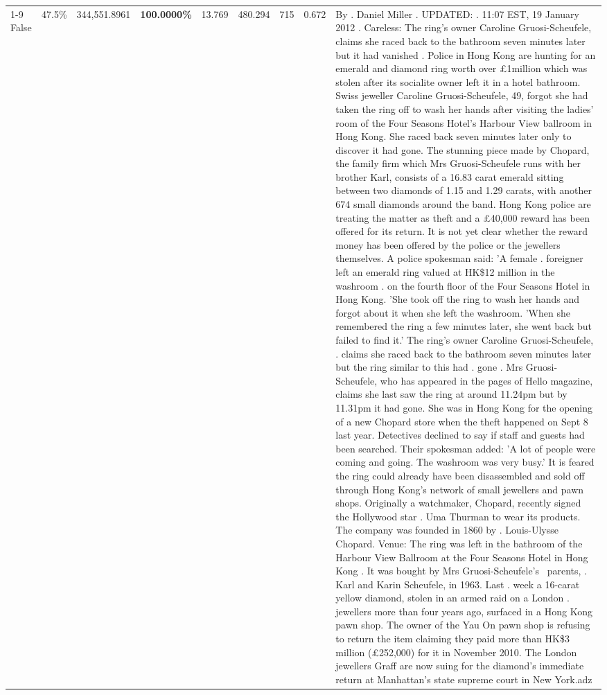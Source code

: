 \begin{table}[H]
\begin{tabular}{lllrlllll}
\cline{1-9}
False & 47.5\% & 344,551.8961 & \bfseries \color{red} 100.0000\% & 13.769 & 480.294 & 715 & 0.672 & By . Daniel Miller . UPDATED: . 11:07 EST, 19 January 2012 . Careless: The ring's owner Caroline Gruosi-Scheufele, claims she raced back to the bathroom seven minutes later but it had vanished . Police in Hong Kong are hunting for an emerald and diamond ring worth over £1million which was stolen after its socialite owner left it in a hotel bathroom. Swiss jeweller Caroline Gruosi-Scheufele, 49, forgot she had taken the ring off to wash her hands after visiting the ladies' room of the Four Seasons Hotel's Harbour View ballroom in Hong Kong. She raced back seven minutes later only to discover it had gone. The stunning piece made by Chopard, the family firm which Mrs Gruosi-Scheufele runs with her brother Karl, consists of a 16.83 carat emerald sitting between two diamonds of 1.15 and 1.29 carats, with another 674 small diamonds around the band. Hong Kong police are treating the matter as theft and a £40,000 reward has been offered for its return. It is not yet clear whether the reward money has been offered by the police or the jewellers themselves. A police spokesman said: 'A female . foreigner left an emerald ring valued at HK\$12 million in the washroom . on the fourth floor of the Four Seasons Hotel in Hong Kong. 'She took off the ring to wash her hands and forgot about it when she left the washroom. 'When she remembered the ring a few minutes later, she went back but failed to find it.' The ring's owner Caroline Gruosi-Scheufele, . claims she raced back to the bathroom seven minutes later but the ring similar to this had . gone . Mrs Gruosi-Scheufele, who has appeared in the pages of Hello magazine, claims she last saw the ring at around 11.24pm but by 11.31pm it had gone. She was in Hong Kong for the opening of a new Chopard store when the theft happened on Sept 8 last year. Detectives declined to say if staff and guests had been searched. Their spokesman added: 'A lot of people were coming and going. The washroom was very busy.' It is feared the ring could already have been disassembled and sold off through Hong Kong's network of small jewellers and pawn shops. Originally a watchmaker, Chopard, recently signed the Hollywood star . Uma Thurman to wear its products. The company was founded in 1860 by . Louis-Ulysse Chopard. Venue: The ring was left in the bathroom of the Harbour View Ballroom at the Four Seasons Hotel in Hong Kong . It was bought by Mrs Gruosi-Scheufele's  parents, . Karl and Karin Scheufele, in 1963. Last . week a 16-carat yellow diamond, stolen in an armed raid on a London . jewellers more than four years ago, surfaced in a Hong Kong pawn shop. The owner of the Yau On pawn shop is refusing to return the item claiming they paid more than HK\$3 million (£252,000) for it in November 2010. The London jewellers Graff are now suing for the diamond’s immediate return at Manhattan’s state supreme court in New York.adz \\

\end{tabular}
\end{table}
